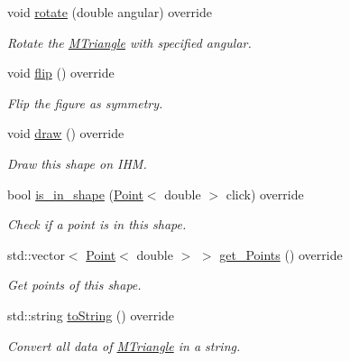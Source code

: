 \begin{DoxyCompactItemize}
void \hyperlink{classMTriangle_a4be29553eeddf99c367b1ec220bc102b}{rotate} (double angular) override
\begin{DoxyCompactList}\small\item\em Rotate the \hyperlink{classMTriangle}{M\+Triangle} with specified angular. \end{DoxyCompactList}\item 
\mbox{\label{classMTriangle_a6258b96b57c1892098f84a5a5fa0f976}} 
void \hyperlink{classMTriangle_a6258b96b57c1892098f84a5a5fa0f976}{flip} () override
\begin{DoxyCompactList}\small\item\em Flip the figure as symmetry. \end{DoxyCompactList}\item 
\mbox{\label{classMTriangle_a7801818e2188f39ba89a2a82df8fa5fe}} 
void \hyperlink{classMTriangle_a7801818e2188f39ba89a2a82df8fa5fe}{draw} () override
\begin{DoxyCompactList}\small\item\em Draw this shape on I\+HM. \end{DoxyCompactList}\item 
bool \hyperlink{classMTriangle_a8d3d737a903823bf1a631cbb004a799c}{is\+\_\+in\+\_\+shape} (\hyperlink{classPoint}{Point}$<$ double $>$ click) override
\begin{DoxyCompactList}\small\item\em Check if a point is in this shape. \end{DoxyCompactList}\item 
std\+::vector$<$ \hyperlink{classPoint}{Point}$<$ double $>$ $>$ \hyperlink{classMTriangle_a90351a097a20d35f9d6c4d05ad881e48}{get\+\_\+\+Points} () override
\begin{DoxyCompactList}\small\item\em Get points of this shape. \end{DoxyCompactList}\item 
std\+::string \hyperlink{classMTriangle_a7d1fd825592dffa6ac05b3398a8c105a}{to\+String} () override
\begin{DoxyCompactList}\small\item\em Convert all data of \hyperlink{classMTriangle}{M\+Triangle} in a string. \end{DoxyCompactList}\end{DoxyCompactItemize}


